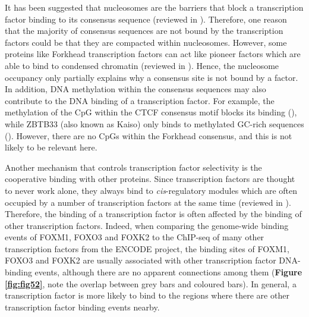 It has been suggested that nucleosomes are the barriers that block a transcription factor binding to its consensus sequence (reviewed in \cite{li2007the}). Therefore, one reason that the majority of consensus sequences are not bound by the transcription factors could be that they are compacted within nucleosomes. However, some proteins like Forkhead transcription factors can act like pioneer factors which are able to bind to condensed chromatin (reviewed in \cite{zaret2011pioneer}). Hence, the nucleosome occupancy only partially explains why a consensus site is not bound by a factor. In addition, DNA methylation within the consensus sequences may also contribute to the DNA binding of a transcription factor. For example, the methylation of the CpG within the CTCF consensus motif blocks its binding (\cite{bell2000methylation}), while ZBTB33 (also known as Kaiso) only binds to methylated GC-rich sequences (\cite{yoon2003n-cor}). However, there are no CpGs within the Forkhead consensus, and this is not likely to be relevant here.

Another mechanism that controls transcription factor selectivity is the cooperative binding with other proteins. Since transcription factors are thought to never work alone, they always bind to \textit{cis}-regulatory modules which are often occupied by a number of transcription factors at the same time (reviewed in \cite{farnham2009insights}). Therefore, the binding of a transcription factor is often affected by the binding of other transcription factors. Indeed, when comparing the genome-wide binding events of FOXM1, FOXO3 and FOXK2 to the ChIP-seq of many other transcription factors from the ENCODE project, the binding sites of FOXM1, FOXO3 and FOXK2 are usually associated with other transcription factor DNA-binding events, although there are no apparent connections among them (\textbf{Figure \ref{fig:fig52}}, note the overlap between grey bars and coloured bars). In general, a transcription factor is more likely to bind to the regions where there are other transcription factor binding events nearby.

